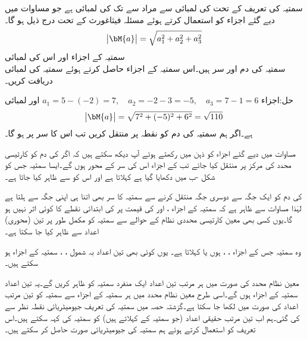 سمتیہ کی تعریف کے تحت  کی لمبائی سے مراد  سے  تک کی لمبائی  ہے جو مساوات  میں دیے گئے اجزاء کو استعمال کرتے ہوئے مسئلہ فیثاغورث کے تحت درج ذیل ہو گا۔
\begin{align}
\abs{\bM{a}}=\sqrt{a_1^2+a_2^2+a_3^2}
\end{align} 
\quad سمتیہ کے اجزاء اور اس کی لمبائی\\
سمتیہ  کی دم  اور سر  ہیں۔اس سمتیہ کے اجزاء حاصل کرتے ہوئے سمتیہ کی لمبائی دریافت کریں۔

حل:اجزاء 
$a_1=5-(-2)=7,\quad a_2=-2-3=-5,\quad a_3=7-1=6$
اور لمبائی
\begin{align*}
\abs{\bM{a}}=\sqrt{7^2+(-5)^2+6^2}=\sqrt{110}
\end{align*}
ہے۔اگر ہم سمتیہ  کی دم کو نقطہ  پر منتقل کریں تب اس کا سر  پر ہو گا۔

مساوات  میں دیے گئے اجزاء کو ذہن میں رکھتے ہوئے آپ دیکھ سکتے ہیں کہ اگر  کی دم کو کارتیسی محدد کی مرکز پر منتقل کیا جائے تب  کے اجزاء اس کی سر کے محور ہوں گے۔ایسا سمتیہ جس کو شکل -ب میں دکھایا گیا ہے   کہلاتا ہے اور اس کو  سے ظاہر کیا جاتا ہے۔ 

 کی دم کو ایک جگہ سے دوسری جگہ منتقل کرنے سے سمتیہ کا سر بھی اتنا ہی اپنی جگہ سے ہلتا ہے لہٰذا مساوات  سے ظاہر ہے کہ سمتیہ  کے اجزاء ،  اور  کی قیمت پر  کی ابتدائی نقطے کا کوئی اثر نہیں ہو گا۔یوں کسی بھی معین کارتیسی محددی نظام کے حوالے سے سمتیہ کو مکمل طور پر تین (محوری) اعداد سے ظاہر کیا جا سکتا ہے۔

 وہ سمتیہ  جس کے اجزاء ، ،  ہوں  یا   کہلاتا ہے۔ یوں کوئی بھی تین اعداد بہ شمول  ، ،  سمتیہ کے اجزاء ہو سکتے ہیں۔

معین نظام محدد کی صورت میں  ہر مرتب تین اعداد ایک منفرد سمتیہ کو ظاہر کریں گے۔یہ تین اعداد سمتیہ کے اجزاء ہوں گے۔اسی طرح معین نظام محدد میں ہر سمتیہ کے اجزاء سے سمتیہ کو تین مرتب اعداد کی صورت میں لکھا جا سکتا ہے۔گزشتہ حصہ میں سمتیہ کی تعریف جیومیٹریائی نقطہ نظر سے کی گئی۔ہم اب تین مرتب حقیقی اعداد (جو سمتیہ کے  کہلاتے ہیں) کو سمتیہ کی  کہہ سکتے ہیں۔اس تعریف کو  استعمال کرتے ہوئے ہم سمتیہ کی جیومیٹریائی صورت حاصل کر سکتے ہیں۔  

